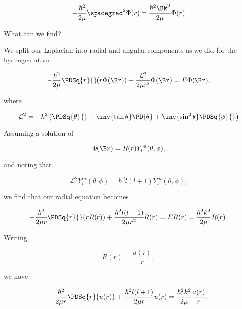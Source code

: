 \begin{equation}\label{eqn:qmTwoL23:60}
- \frac{\hbar^2}{2\mu} \spacegrad^2
\Phi(r)
 = \frac{\hbar^2 \Bk^2}{2 \mu}
\Phi(r)
\end{equation}

What can we find?

We split our Laplacian into radial and angular components as we did for the hydrogen atom

\begin{equation}\label{eqn:qmTwoL23:80}
- \frac{\hbar^2}{2\mu} \PDSq{r}{} (r \Phi(\Br)) +
\frac{\mathcal{L}^2}{2 \mu r^2}
\Phi(\Br)
=
E \Phi(\Br),
\end{equation}

where

\begin{equation}\label{eqn:qmTwoL23:100}
\mathcal{L}^2 = -\hbar^2 \left(
\PDSq{\theta}{}
+ \inv{\tan\theta} \PD{\theta}
+ \inv{\sin^2\theta} \PDSq{\phi}{}
\right)
\end{equation}

Assuming a solution of

\begin{equation}\label{eqn:qmTwoL23:120}
\Phi(\Br) = R(r) Y_l^m(\theta, \phi),
\end{equation}

and noting that

\begin{equation}\label{eqn:qmTwoL23:140}
\mathcal{L}^2 Y_l^m(\theta, \phi) = \hbar^2 l (l+1) Y_l^m(\theta, \phi),
\end{equation}

we find that our radial equation becomes

\begin{equation}\label{eqn:qmTwoL23:160}
- \frac{\hbar^2}{2 \mu r} \PDSq{r}{} (r R(r))
+\frac{\hbar^2 l (l+1)
}{2 \mu r^2}
R(r)
=
E R(r)
=
\frac{\hbar^2 k^2}{2\mu} R(r).
\end{equation}

Writing

\begin{equation}\label{eqn:qmTwoL23:180}
R(r) = \frac{u(r)}{r},
\end{equation}

we have

\begin{equation}\label{eqn:qmTwoL23:200}
- \frac{\hbar^2}{2 \mu r} \PDSq{r}{u(r)}
+\frac{\hbar^2 l (l+1)
}{2 \mu r}
u(r)
=
\frac{\hbar^2 k^2}{2\mu}
 \frac{u(r)}{r},
\end{equation}

